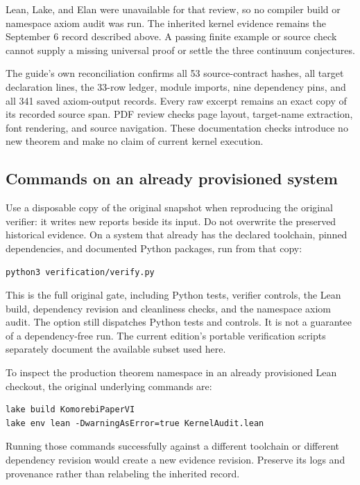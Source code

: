 Lean, Lake, and Elan were unavailable for that review, so no compiler build or namespace axiom audit was run. The inherited kernel evidence remains the September 6 record described above. A passing finite example or source check cannot supply a missing universal proof or settle the three continuum conjectures.

The guide's own reconciliation confirms all 53 source-contract hashes, all target declaration lines, the 33-row ledger, module imports, nine dependency pins, and all 341 saved axiom-output records. Every raw excerpt remains an exact copy of its recorded source span. PDF review checks page layout, target-name extraction, font rendering, and source navigation. These documentation checks introduce no new theorem and make no claim of current kernel execution.

\subsection{Commands on an already provisioned system}
Use a disposable copy of the original snapshot when reproducing the original verifier: it writes new reports beside its input. Do not overwrite the preserved historical evidence. On a system that already has the declared toolchain, pinned dependencies, and documented Python packages, run from that copy:
\begin{Verbatim}[fontsize=\small,frame=leftline,breaklines=true]
python3 verification/verify.py
\end{Verbatim}
This is the full original gate, including Python tests, verifier controls, the Lean build, dependency revision and cleanliness checks, and the namespace axiom audit. The  option still dispatches Python tests and controls. It is not a guarantee of a dependency-free run. The current edition's portable verification scripts separately document the available subset used here.

To inspect the production theorem namespace in an already provisioned Lean checkout, the original underlying commands are:
\begin{Verbatim}[fontsize=\small,frame=leftline,breaklines=true]
lake build KomorebiPaperVI
lake env lean -DwarningAsError=true KernelAudit.lean
\end{Verbatim}
Running those commands successfully against a different toolchain or different dependency revision would create a new evidence revision. Preserve its logs and provenance rather than relabeling the inherited record.


